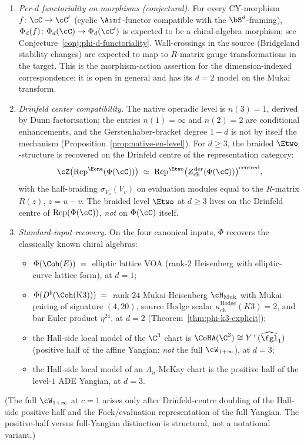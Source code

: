 \begin{theorem}
\begin{enumerate}[label=\textup{(U\arabic*)}]
 \item\label{phi:U2} \emph{Per-$d$ functoriality on morphisms \textup{(}conjectural\textup{).}} For every CY-morphism $f \colon \cC \to \cC'$ \textup{(}cyclic $\Ainf$-functor compatible with the $\bS^d$-framing\textup{),} $\Phi_d(f) \colon \Phi_d(\cC) \to \Phi_d(\cC')$ is expected to be a chiral-algebra morphism; see Conjecture~\textup{\ref{conj:phi-d-functoriality}}. Wall-crossings in the source \textup{(}Bridgeland stability changes\textup{)} are expected to map to $R$-matrix gauge transformations in the target. This is the morphism-action assertion for the dimension-indexed correspondence; it is open in general and has its \(d=2\) model on the Mukai transform.
 \item\label{phi:U3} \emph{Drinfeld center compatibility.} The native operadic level is $n(3) = 1$, derived by Dunn factorisation; the entries $n(1) = \infty$ and $n(2) = 2$ are conditional enhancements, and the Gerstenhaber-bracket degree $1 - d$ is not by itself the mechanism \textup{(}Proposition~\ref{prop:native-en-level}\textup{).} For $d \geq 3$, the braided $\Etwo$-structure is recovered on the Drinfeld centre of the representation category:
 \[
 \cZ\bigl(\mathrm{Rep}^{\Eone}(\Phi(\cC))\bigr) \;\simeq\; \mathrm{Rep}^{\Etwo}\bigl(Z^{\mathrm{der}}_{\mathrm{ch}}(\Phi(\cC))\bigr)^{\mathrm{centred}},
 \]
 with the half-braiding $\sigma_{V_u}(V_v)$ on evaluation modules equal to the $R$-matrix $R(z)$, $z = u - v$. The braided level $\Etwo$ at $d \geq 3$ lives on the Drinfeld centre of $\mathrm{Rep}(\Phi(\cC))$, \emph{not} on $\Phi(\cC)$ itself.
 \item\label{phi:U4} \emph{Standard-input recovery.} On the four canonical inputs, $\Phi$ recovers the classically known chiral algebras:
 \begin{itemize}
 \item $\Phi(\Coh(E)) \;=\;$ elliptic lattice VOA \textup{(}rank-$2$ Heisenberg with elliptic-curve lattice form\textup{),} at $d = 1$;
 \item $\Phi(D^b(\Coh(\mathrm{K3}))) \;=\;$ rank-$24$ Mukai-Heisenberg $\cH_{\mathrm{Muk}}$ with Mukai pairing of signature $(4, 20)$, source Hodge scalar $\kappa_{\mathrm{ch}}^{\mathrm{Hodge}}(K3) = 2$, and bar Euler product $\eta^{24}$, at $d = 2$ \textup{(}Theorem~\textup{\ref{thm:phi-k3-explicit}}\textup{);}
 \item the Hall-side local model of the $\C^3$ chart is
 $\CoHA(\C^3) \cong Y^+(\widehat{\fgl}_1)$ \textup{(}positive half of
 the affine Yangian; \emph{not} the full $\cW_{1+\infty}$\textup{),} at
 $d = 3$;
 \item the Hall-side local model of an $A_n$-McKay chart is the positive half of the level-$1$ ADE Yangian, at $d = 3$.
 \end{itemize}
\end{enumerate}
\textup{(}The full $\cW_{1+\infty}$ at $c = 1$ arises only after
Drinfeld-centre doubling of the Hall-side positive half and the
Fock/evaluation representation of the full Yangian. The positive-half
versus full-Yangian distinction is structural, not a notational
variant.\textup{)}
\end{theorem}

